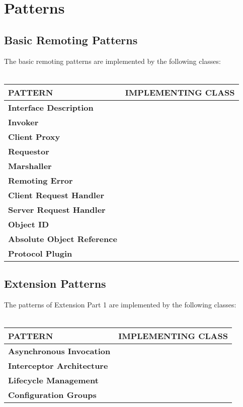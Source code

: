 \documentclass[a4paper]{article}
\begin{document}
\section*{Patterns}
\vspace{1cm}
\subsection*{Basic Remoting Patterns}
The basic remoting patterns are implemented by the following classes:\\\\

\begin{tabular}{| l | l |}\hline
\textbf{PATTERN} & \textbf{IMPLEMENTING CLASS}\\\hline\hline
\textbf{Interface Description} & \\\hline
\textbf{Invoker} & \\\hline
\textbf{Client Proxy} & \\\hline
\textbf{Requestor} & \\\hline
\textbf{Marshaller} & \\\hline
\textbf{Remoting Error} & \\\hline
\textbf{Client Request Handler} & \\\hline
\textbf{Server Request Handler} & \\\hline
\textbf{Object ID} & \\\hline
\textbf{Absolute Object Reference} & \\\hline
\textbf{Protocol Plugin} & \\\hline
\end{tabular}

\vspace{1cm}

\subsection*{Extension Patterns}

The patterns of Extension Part 1 are implemented by the following classes:\\\\

\begin{tabular}{| l | l |}\hline
\textbf{PATTERN} & \textbf{IMPLEMENTING CLASS}\\\hline\hline
\textbf{Asynchronous Invocation} & \\\hline
\textbf{Interceptor Architecture} & \\\hline
\textbf{Lifecycle Management} & \\\hline
\textbf{Configuration Groups} & \\\hline
\end{tabular}
\end{document}

